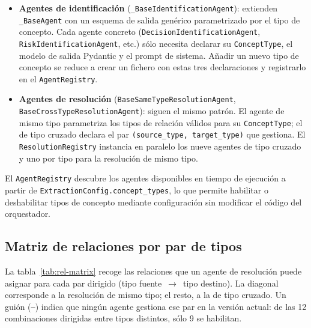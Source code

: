 \begin{itemize}
  \item \textbf{Agentes de identificación} (\texttt{\_BaseIdentificationAgent}): extienden
        \texttt{\_BaseAgent} con un esquema de salida genérico parametrizado por el tipo de
        concepto. Cada agente concreto (\texttt{DecisionIdentificationAgent},
        \texttt{RiskIdentificationAgent}, etc.) sólo necesita declarar su
        \texttt{ConceptType}, el modelo de salida Pydantic y el prompt de sistema. Añadir un
        nuevo tipo de concepto se reduce a crear un fichero con estas tres declaraciones y
        registrarlo en el \texttt{AgentRegistry}.

  \item \textbf{Agentes de resolución} (\texttt{BaseSameTypeResolutionAgent},
        \texttt{BaseCrossTypeResolutionAgent}): siguen el mismo patrón. El agente de mismo
        tipo parametriza los tipos de relación válidos para su \texttt{ConceptType}; el de tipo
        cruzado declara el par \texttt{(source\_type, target\_type)} que gestiona. El
        \texttt{ResolutionRegistry} instancia en paralelo los nueve agentes de tipo cruzado y
        uno por tipo para la resolución de mismo tipo.
\end{itemize}

El \texttt{AgentRegistry} descubre los agentes disponibles en tiempo de ejecución a partir de
\texttt{ExtractionConfig.concept\_types}, lo que permite habilitar o deshabilitar tipos de
concepto mediante configuración sin modificar el código del orquestador.

\subsection{Matriz de relaciones por par de tipos}
\label{anx:matriz-relaciones}

La tabla~\ref{tab:rel-matrix} recoge las relaciones que un agente de resolución puede asignar
para cada par dirigido (tipo fuente~$\rightarrow$~tipo destino). La diagonal corresponde a la
resolución de mismo tipo; el resto, a la de tipo cruzado. Un guión (\texttt{---}) indica que
ningún agente gestiona ese par en la versión actual: de las 12 combinaciones dirigidas entre
tipos distintos, sólo 9 se habilitan.

